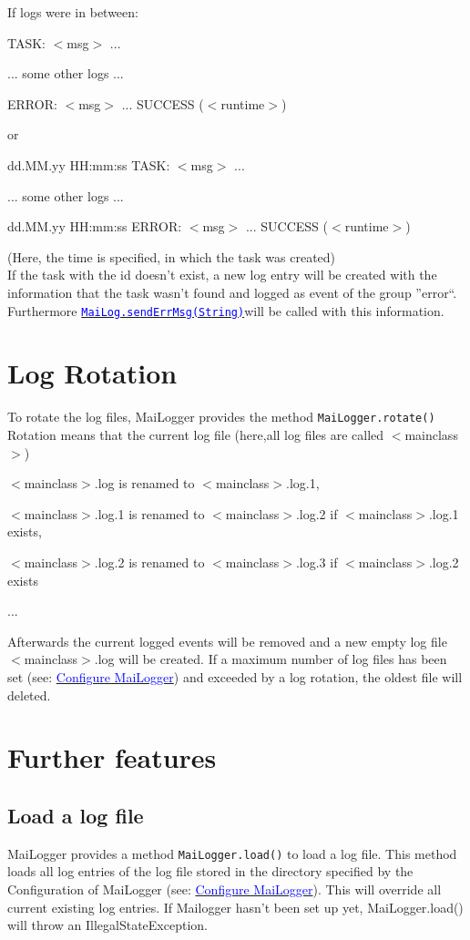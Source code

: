\documentclass{article}
\newcommand{\refh}[2]{\hyperref[#1] {\textcolor{blue}{#2}}}
\newcommand{\tab}[1][1]{\hspace*{#1cm}}
\newcommand{\sendErr}{\refh{setup_interface}{\lstinline|MaiLog.sendErrMsg(String)|}}
\begin{document}
	If logs were in between:
	\begin{description}
		\item TASK: $<$msg$>$ ... 
		\item ... some other logs ...
		\item ERROR: $<$msg$>$ ... SUCCESS ($<$runtime$>$)
		\item or
		\item dd.MM.yy HH:mm:ss TASK: $<$msg$>$ ...
		\item ... some other logs ...
		\item dd.MM.yy HH:mm:ss ERROR: $<$msg$>$ ... SUCCESS ($<$runtime$>$)
	\end{description}
    (Here, the time is specified, in which the task was created) \\
    If the task with the id doesn't exist, a new log entry will be created with the information that the task wasn't found and logged as event of the group ''error``.
    Furthermore \sendErr will be called with this information.

\section{Log Rotation}
\label{rotate}
    To rotate the log files, MaiLogger provides the method \lstinline|MaiLogger.rotate()|
    Rotation means that the current log file (here,all log files are called $<$mainclass$>$)
    \begin{description}
        \item $<$mainclass$>$.log is renamed to $<$mainclass$>$.log.1,
        \item $<$mainclass$>$.log.1 is renamed to $<$mainclass$>$.log.2 if $<$mainclass$>$.log.1 exists,
        \item $<$mainclass$>$.log.2 is renamed to $<$mainclass$>$.log.3 if $<$mainclass$>$.log.2 exists
        \item \tab[5]...
    \end{description}
    Afterwards the current logged events will be removed and a new empty log file $<$mainclass$>$.log will be created.
    If a maximum number of log files has been set (see: \refh{setup_mailogger.setup}{Configure MaiLogger}) and exceeded by a log rotation, the oldest file will deleted.

\section{Further features}
\label{other}
    \subsection{Load a log file}
    \label{other_load}
    MaiLogger provides a method \lstinline|MaiLogger.load()| to load a log file.
    This method loads all log entries of the log file stored in the directory specified by the Configuration of MaiLogger (see: \refh{setup_mailogger.setup}{Configure MaiLogger}).
    This will override all current existing log entries.
    If Mailogger hasn't been set up yet, MaiLogger.load() will throw an IllegalStateException.
\end{document}
